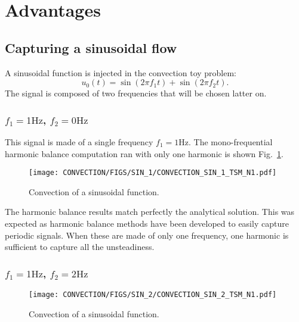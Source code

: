 \section{Advantages} %
\label{sec:advantages}

\subsection{Capturing a sinusoidal flow} %
\label{sub:capturing_a_sinusoidal_flow}

A sinusoidal function is injected in the convection toy problem:
\begin{equation}
	u_0(t) = \sin (2 \pi f_1 t) + \sin(2 \pi f_2 t).
\end{equation}
The signal is composed of two frequencies that will 
be chosen latter on.

\subsubsection{$f_1 = 1 \text{Hz}$, $f_2 = 0 \text{Hz}$}

This signal is made of a single frequency $f_1 = 1 \text{Hz}$.
The mono-frequential harmonic balance computation ran with only one harmonic
is shown Fig.~\ref{fig:convection_sin_1_tsm_n_1}.
\begin{figure}[htbp]
  \begin{center}
    \texttt{[image: CONVECTION/FIGS/SIN\_1/CONVECTION\_SIN\_1\_TSM\_N1.pdf]}
  \end{center}
  \caption{Convection of a sinusoidal function.}
  \label{fig:convection_sin_1_tsm_n_1}
\end{figure}
The harmonic balance results match perfectly the analytical solution.
This was expected as harmonic balance methods have been developed to
easily capture periodic signals. When these are made of only one frequency,
one harmonic is sufficient to capture all the unsteadiness.

\subsubsection{$f_1 = 1 \text{Hz}$, $f_2 = 2 \text{Hz}$}

\begin{figure}[htbp]
  \begin{center}
    \texttt{[image: CONVECTION/FIGS/SIN\_2/CONVECTION\_SIN\_2\_TSM\_N1.pdf]}
  \end{center}
  \caption{Convection of a sinusoidal function.}
  \label{fig:convection_sin_2_tsm_n_1}
\end{figure}

